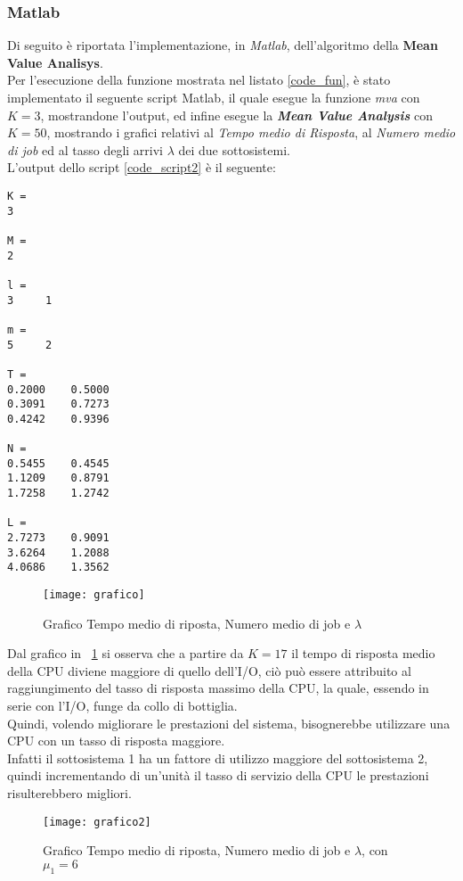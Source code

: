 \clearpage

\subsubsection{Matlab}
Di seguito è riportata l'implementazione, in \textit{Matlab}, dell'algoritmo
della \textbf{Mean Value Analisys}.\\


Per l'esecuzione della funzione mostrata nel listato \ref{code_fun}, è stato implementato
 il seguente script Matlab, il quale esegue la funzione \textit{mva} con $K=3$,
 mostrandone l'output, ed infine esegue la \textbf{\textit{Mean Value Analysis}} con
 $K=50$, mostrando i grafici relativi al \textit{Tempo medio di Risposta},
 al \textit{Numero medio di job} ed al tasso degli arrivi $\lambda$
 dei due sottosistemi.\\



\vspace{0.4cm}
L'output dello script \ref{code_script2} è il seguente:

\color{black} \begin{verbatim}
K =
3

M =
2

l =
3     1

m =
5     2

T =
0.2000    0.5000
0.3091    0.7273
0.4242    0.9396

N =
0.5455    0.4545
1.1209    0.8791
1.7258    1.2742

L =
2.7273    0.9091
3.6264    1.2088
4.0686    1.3562
\end{verbatim} \color{black}

\begin{figure}[!htbp]
  \centering
  \texttt{[image: grafico]}
  \caption{Grafico Tempo medio di riposta, Numero medio di job e $\lambda$}
  \label{code_graph1}
\end{figure}

Dal grafico in \figurename~\ref{code_graph1} si osserva che a partire da $K=17$ il
tempo di risposta medio della CPU diviene maggiore di quello dell'I/O, ciò può
essere attribuito al raggiungimento del tasso di risposta massimo della CPU,
la quale, essendo in serie con l'I/O, funge da collo di bottiglia.\\
Quindi, volendo migliorare le prestazioni del sistema, bisognerebbe utilizzare
una CPU con un tasso di risposta maggiore.\\
Infatti il sottosistema 1 ha un fattore di utilizzo maggiore del sottosistema 2,
quindi incrementando di un'unità il tasso di servizio della CPU le prestazioni
risulterebbero migliori.\\

\begin{figure}[!htbp]
  \centering
  \texttt{[image: grafico2]}
  \caption{Grafico Tempo medio di riposta, Numero medio di job e $\lambda$, con $\mu_1=6$}
  \label{code_graph2}
\end{figure}
